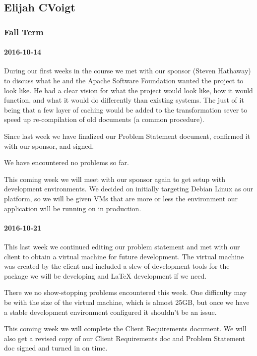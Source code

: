 \subsection{Elijah CVoigt}

\subsubsection{Fall Term}

\paragraph{2016-10-14}

During our first weeks in the course we met with our sponsor (Steven Hathaway) to discuss what he and the Apache Software Foundation wanted the project to look like.
He had a clear vision for what the project would look like, how it would function, and what it would do differently than existing systems.
The just of it being that a few layer of caching would be added to the transformation sever to speed up re-compilation of old documents (a common procedure).

Since last week we have finalized our Problem Statement document, confirmed it with our sponsor, and signed.

We have encountered no problems so far.

This coming week we will meet with our sponsor again to get setup with development environments.
We decided on initially targeting Debian Linux as our platform, so we will be given VMs that are more or less the environment our application will be running on in production.

\paragraph{2016-10-21}

This last week we continued editing our problem statement and met with our client to obtain a virtual machine for future development.
The virtual machine was created by the client and included a slew of development tools for the package we will be developing and LaTeX development if we need.

There we no show-stopping problems encountered this week.
One difficulty may be with the size of the virtual machine, which is almost 25GB, but once we have a stable development environment configured it shouldn't be an issue.

This coming week we will complete the Client Requirements document.
We will also get a revised copy of our Client Requirements doc and Problem Statement doc signed and turned in on time.

